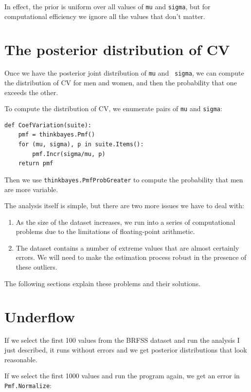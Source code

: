 \documentclass[12pt]{book}
\begin{document}
In effect, the prior is uniform over all values 
of {\tt mu} and {\tt sigma}, but for computational efficiency
we ignore all the values that don't matter.

\section{The posterior distribution of CV}

Once we have the posterior joint distribution of {\tt mu} and {\tt
  sigma}, we can compute the distribution of CV for men and women, and
then the probability that one exceeds the other.

To compute the distribution of CV, we enumerate pairs of
{\tt mu} and {\tt sigma}:

\begin{verbatim}
def CoefVariation(suite):
    pmf = thinkbayes.Pmf()
    for (mu, sigma), p in suite.Items():
        pmf.Incr(sigma/mu, p)
    return pmf
\end{verbatim}

Then we use \verb"thinkbayes.PmfProbGreater" to compute the
probability that men are more variable.

The analysis itself is simple, but there are two more issues we
have to deal with:

\begin{enumerate}

\item As the size of the dataset increases, we run into a series of
  computational problems due to the limitations of floating-point
  arithmetic.

\item The dataset contains a number of extreme values that are almost
  certainly errors.  We will need to make the estimation process
  robust in the presence of these outliers.

\end{enumerate}

The following sections explain these problems and their solutions.


\section{Underflow}
\label{underflow}

If we select the first 100 values from the BRFSS dataset and run the
analysis I just described, it runs without errors and we get posterior
distributions that look reasonable.

If we select the first 1000 values and run the program again, we get
an error in \verb"Pmf.Normalize":
\end{document}
